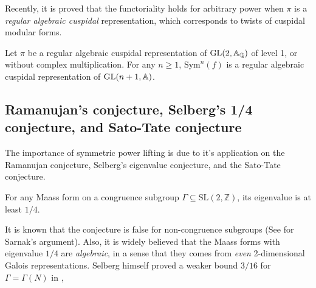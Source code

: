Recently, it is proved that the functoriality holds for arbitrary power when $\pi$ is a \emph{regular algebraic cuspidal} representation, which corresponds to twists of cuspidal modular forms.
\begin{theorem}
Let $\pi$ be a regular algebraic cuspidal representation of $\operatorname{\mathrm{GL}}(2, \mathbb{A}_{\mathbb{Q}})$ of level 1, or without complex multiplication.
For any $n\geq 1$, $\mathrm{Sym}^{n}(f)$ is a regular algebraic cuspidal representation of $\operatorname{\mathrm{GL}}(n + 1, \mathbb{A})$.
\end{theorem}


\subsection{Ramanujan's conjecture, Selberg's 1/4 conjecture, and Sato-Tate conjecture}

The importance of symmetric power lifting is due to it's application on the Ramanujan conjecture, Selberg's eigenvalue conjecture, and the Sato-Tate conjecture.

\begin{conjecture}
For any Maass form on a congruence subgroup $\Gamma \subseteq \mathrm{SL}(2, \mathbb{Z})$, its eigenvalue is at least $1/4$.
\end{conjecture}
It is known that the conjecture is false for non-congruence subgroups (See \cite{sarnak1995selberg} for Sarnak's argument). 
Also, it is widely believed that the Maass forms with eigenvalue $1/4$ are \emph{algebraic}, in a sense that they comes from \emph{even} 2-dimensional Galois representations.
Selberg himself proved a weaker bound $3/16$ for $\Gamma = \Gamma(N)$ in \cite{selberg1965estimation}, 

